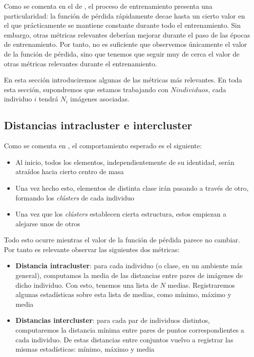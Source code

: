 Como se comenta en el  de \cite{informatica:principal}, el proceso de entrenamiento presenta una particularidad: la función de pérdida rápidamente decae hasta un cierto valor en el que prácticamente se mantiene constante durante todo el entrenamiento. Sin embargo, otras métricas relevantes deberían mejorar durante el paso de las épocas de entrenamiento. Por tanto, no es suficiente que observemos únicamente el valor de la función de pérdida, sino que tenemos que seguir muy de cerca el valor de otras métricas relevantes durante el entrenamiento.

En esta sección introduciremos algunas de las métricas más relevantes. En toda esta sección, supondremos que estamos trabajando con $N individuos$, cada individuo $i$ tendrá $N_i$ imágenes asociadas.

\subsection{Distancias intracluster e intercluster} \label{isubs:teoria_distancia_intra_inter_cluster}

Como se comenta en \cite{informatica:paper_cacd}, el comportamiento esperado es el siguiente:

\begin{itemize}
    \item Al inicio, todos los elementos, independientemente de su identidad, serán atraídos hacia cierto centro de masa
    \item Una vez hecho esto, elementos de distinta clase irán pasando a través de otro, formando los \textit{clústers} de cada individuo
    \item Una vez que los \textit{clústers} establecen cierta estructura, estos empiezan a alejarse unos de otros
\end{itemize}

Todo esto ocurre mientras el valor de la función de pérdida parece no cambiar. Por tanto es relevante observar las siguientes dos métricas:

\begin{itemize}
    \item \textbf{Distancia intracluster}: para cada individuo (o clase, en un ambiente más general), computamos la media de las distancias entre pares de imágenes de dicho individuo. Con esto, tenemos una lista de $N$ medias. Registraremos algunas estadísticas sobre esta lista de medias, como mínimo, máximo y media
    \item \textbf{Distancias intercluster}: para cada par de individuos distintos, computaremos la distancia mínima entre pares de puntos correspondientes a cada individuo. De estas distancias entre conjuntos vuelvo a registrar las mismas estadísticas: mínimo, máximo y media
\end{itemize}

